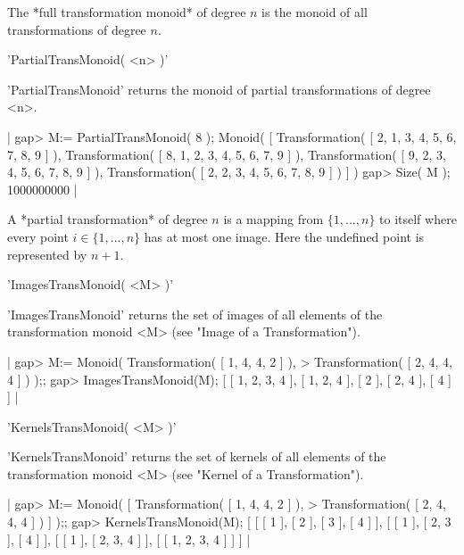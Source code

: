 The   *full transformation monoid* of  degree  $n$ is  the  monoid of all
transformations of degree $n$.

%

'PartialTransMonoid( <n> )'

'PartialTransMonoid'  returns  the monoid  of partial  transformations of
degree <n>.

|    gap> M:= PartialTransMonoid( 8 );
    Monoid( [ Transformation( [ 2, 1, 3, 4, 5, 6, 7, 8, 9 ] ), 
      Transformation( [ 8, 1, 2, 3, 4, 5, 6, 7, 9 ] ), 
      Transformation( [ 9, 2, 3, 4, 5, 6, 7, 8, 9 ] ), 
      Transformation( [ 2, 2, 3, 4, 5, 6, 7, 8, 9 ] ) ] )
    gap> Size( M );
    1000000000 |
    
A *partial transformation*  of degree $n$  is a  mapping from $\{1,  ...,
n\}$ to itself where  every point $i \in  \{1, ..., n\}$  has at most one
image.  Here the undefined point is represented by $n+1$.


'ImagesTransMonoid( <M> )'

'ImagesTransMonoid'  returns the set    of images of  all elements of the
transformation monoid <M> (see "Image of a Transformation").

|    gap> M:= Monoid( Transformation( [ 1, 4, 4, 2 ] ),    
    >       Transformation( [ 2, 4, 4, 4 ] ) );;   
    gap> ImagesTransMonoid(M);                                              
    [ [ 1, 2, 3, 4 ], [ 1, 2, 4 ], [ 2 ], [ 2, 4 ], [ 4 ] ] |


'KernelsTransMonoid( <M> )'

'KernelsTransMonoid' returns  the set of kernels of  all  elements of the
transformation monoid <M> (see "Kernel of a Transformation").

|    gap> M:= Monoid( [ Transformation( [ 1, 4, 4, 2 ] ),    
    >       Transformation( [ 2, 4, 4, 4 ] ) ] );;   
    gap> KernelsTransMonoid(M);
    [ [ [ 1 ], [ 2 ], [ 3 ], [ 4 ] ], [ [ 1 ], [ 2, 3 ], [ 4 ] ], 
      [ [ 1 ], [ 2, 3, 4 ] ], [ [ 1, 2, 3, 4 ] ] ] |



